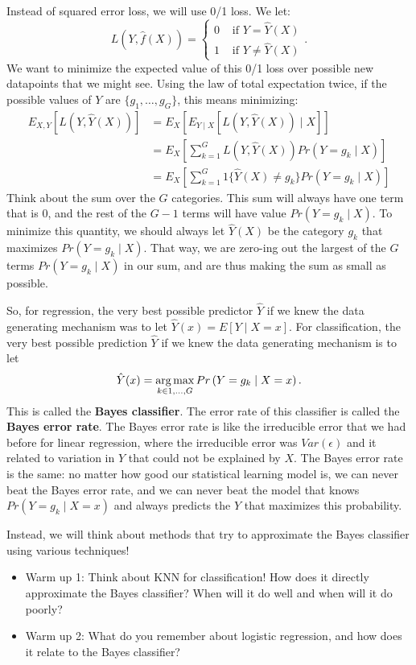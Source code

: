 Instead of squared error loss, we will use 0/1 loss. We let: 
$$
L(Y, \hat{f}(X)) = \begin{cases}
 0 & \text { if } Y = \hat{Y}(X) \\
 1 & \text{ if } Y \neq \hat{Y}(X)	
 \end{cases}. 
$$
We want to minimize the expected value of this 0/1 loss over possible new datapoints that we might see. Using the law of total expectation twice, if the possible values of $Y$ are $\{g_1, \ldots, g_G\}$, this means minimizing: 
\begin{align*}
E_{X,Y} \left[ L(Y, \hat{Y}(X)) \right] &= E_{X} \left[ E_{Y \mid X} \left[ L(Y, \hat{Y}(X)) \mid X \right] \right] \\
&= E_X \left [ \sum_{k=1}^G L(Y, \hat{Y}(X)) Pr(Y=g_k \mid X) \right] \\
&= E_X \left [ \sum_{k=1}^G 1\{ \hat{Y}(X) \not= g_k \} Pr(Y=g_k \mid X) \right] 
\end{align*}
Think about the sum over the $G$ categories. This sum will always have one term that is $0$, and the rest of the $G-1$ terms will have value $Pr(Y=g_k \mid X)$. To minimize this quantity, we should always let $\hat{Y}(X)$ be the category $g_k$ that maximizes $Pr(Y=g_k \mid X)$. That way, we are zero-ing out the largest of the $G$ terms $Pr(Y=g_k \mid X)$ in our sum, and are thus making the sum as small as possible. 

So, for regression, the very best possible predictor $\hat{Y}$ if we knew the data generating mechanism was to let $\hat{Y}(x) = E[Y \mid X=x]$. For classification, the very best possible prediction $\hat{Y}$ if we knew the data generating mechanism is to let 
$$
\hat{Y}(x) = \mathop{\mathrm{arg\,max}}_{k \in 1,\ldots, G } Pr\left( Y = g_k \mid X=x \right). 
$$ 
This is called the \textbf{Bayes classifier}. The error rate of this classifier is called the \textbf{Bayes error rate}. The Bayes error rate is like the irreducible error that we had before for linear regression, where the irreducible error was $Var(\epsilon)$ and it related to variation in $Y$ that could not be explained by $X$. The Bayes error rate is the same: no matter how good our statistical learning model is, we can never beat the Bayes error rate, and we can never beat the model that knows $Pr\left( Y = g_k \mid X=x \right)$ and always predicts the $Y$ that maximizes this probability. 

Instead, we will think about methods that try to approximate the Bayes classifier using various techniques! 
\begin{itemize}
\item Warm up 1: Think about KNN for classification! How does it directly approximate the Bayes classifier? When will it do well and when will it do poorly? 
\item Warm up 2: What do you remember about logistic regression, and how does it relate to the Bayes classifier? 
\end{itemize}


